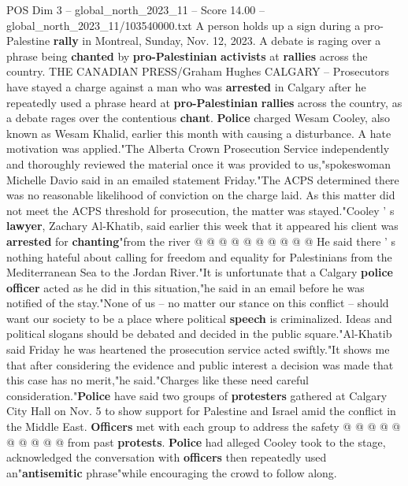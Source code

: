 \begin{textsample}{POS Dim 3 – global\_north\_2023\_11 – Score 14.00 – global\_north\_2023\_11/103540000.txt}  \label{ex:f3_pos_170}
A person holds up a sign during a pro-Palestine \textbf{rally} in Montreal, Sunday, Nov. 12, 2023.
A debate is raging over a phrase being \textbf{chanted} by \textbf{pro-Palestinian} \textbf{activists} at \textbf{rallies} across the country.
THE CANADIAN PRESS/Graham Hughes CALGARY -- Prosecutors have stayed a charge against a man who was \textbf{arrested} in Calgary after he repeatedly used a phrase heard at \textbf{pro-Palestinian} \textbf{rallies} across the country, as a debate rages over the contentious \textbf{chant}. \textbf{Police} charged Wesam Cooley, also known as Wesam Khalid, earlier this month with causing a disturbance.
A hate motivation was applied."The Alberta Crown Prosecution Service independently and thoroughly reviewed the material once it was provided to us,"spokeswoman Michelle Davio said in an emailed statement Friday."The ACPS determined there was no reasonable likelihood of conviction on the charge laid.
As this matter did not meet the ACPS threshold for prosecution, the matter was stayed."Cooley ' s \textbf{lawyer}, Zachary Al-Khatib, said earlier this week that it appeared his client was \textbf{arrested} for \textbf{chanting}"from the river @ @ @ @ @ @ @ @ @ @ He said there ' s nothing hateful about calling for freedom and equality for Palestinians from the Mediterranean Sea to the Jordan River."It is unfortunate that a Calgary \textbf{police} \textbf{officer} acted as he did in this situation,"he said in an email before he was notified of the stay."None of us -- no matter our stance on this conflict -- should want our society to be a place where political \textbf{speech} is criminalized.
Ideas and political slogans should be debated and decided in the public square."Al-Khatib said Friday he was heartened the prosecution service acted swiftly."It shows me that after considering the evidence and public interest a decision was made that this case has no merit,"he said."Charges like these need careful consideration."\textbf{Police} have said two groups of \textbf{protesters} gathered at Calgary City Hall on Nov. 5 to show support for Palestine and Israel amid the conflict in the Middle East. \textbf{Officers} met with each group to address the safety @ @ @ @ @ @ @ @ @ @ from past \textbf{protests}. \textbf{Police} had alleged Cooley took to the stage, acknowledged the conversation with \textbf{officers} then repeatedly used an"\textbf{antisemitic} phrase"while encouraging the crowd to follow along.

\end{textsample}
